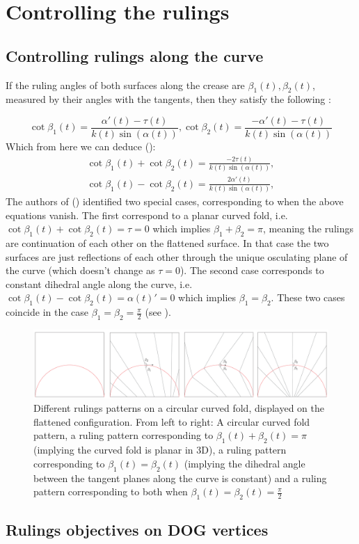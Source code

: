 \section{Controlling the rulings} \label{sec:rulings}

\subsection{Controlling rulings along the curve} 
If the ruling angles of both surfaces along the crease are $\beta_1(t),\beta_2(t)$, measured by their angles with the tangents, then they satisfy the following \cite{more_on_paper,duncan_folded}:

\begin{equation}
\cot\beta_1(t) = \frac{\alpha'(t)-\tau(t)}{k(t)\sin(\alpha(t))},\cot\beta_2(t) = \frac{-\alpha'(t)-\tau(t)}{k(t)\sin(\alpha(t))}
\end{equation}
Which from here we can deduce (\cite{mathematical_omnibus,duncan_folded}):
\begin{equation} \label{cot_eq}
\begin{split}
\cot\beta_1(t) + \cot\beta_2(t) = \frac{-2\tau(t)}{k(t)\sin(\alpha(t))},\\
\cot\beta_1(t) - \cot\beta_2(t) = \frac{2\alpha'(t)}{k(t)\sin(\alpha(t))},
\end{split}	
\end{equation}
The authors of (\cite{mathematical_omnibus,duncan_folded}) identified two special cases, corresponding to when the above equations vanish. The first correspond to a planar curved fold, i.e. $\cot\beta_1(t) + \cot\beta_2(t) = \tau = 0$ which implies $\beta_1+\beta_2 = \pi$, meaning the rulings are continuation of each other on the flattened surface. In that case the two surfaces are just reflections of each other through the unique osculating plane of the curve (which doesn't change as $\tau = 0$). The second case corresponds to constant dihedral angle along the curve, i.e. $\cot\beta_1(t) - \cot\beta_2(t) = \alpha(t)' = 0$ which implies $\beta_1 = \beta_2$. These two cases coincide in the case $\beta_1 = \beta_2 = \frac{\pi}{2}$ (see ).


\begin{figure} [h]
	\centering
	\includegraphics[width=\linewidth]{figures/curved_different_rullings}
	\caption{Different rulings patterns on a circular curved fold, displayed on the flattened configuration. From left to right: A circular curved fold pattern, a ruling pattern corresponding to $\beta_1(t)+\beta_2(t)=\pi$ (implying the curved fold is planar in 3D), a ruling pattern corresponding to $\beta_1(t)=\beta_2(t)$ (implying the dihedral angle between the tangent planes along the curve is constant) and a ruling pattern corresponding to both when $\beta_1(t)=\beta_2(t)=\frac{\pi}{2}$}
	\label{fig:curved_different_rullings}
\end{figure}

\subsection{Rulings objectives on DOG vertices}
